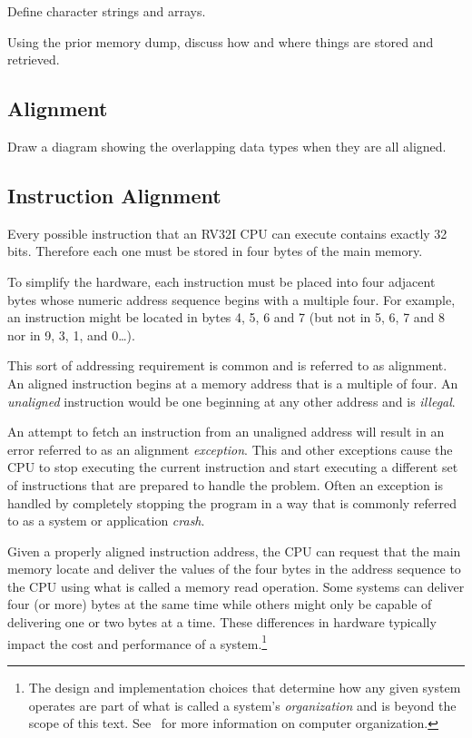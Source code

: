 Define character strings and arrays.

Using the prior memory dump, discuss how and where things are stored and
retrieved.

\subsection{Alignment}

Draw a diagram showing the overlapping data types when they are all aligned.


\subsection{Instruction Alignment}

%
Every possible instruction that an RV32I CPU can execute contains
exactly 32 bits.  Therefore each one must be stored in four bytes 
of the main memory.

To simplify the hardware, each instruction must be placed into four 
adjacent bytes whose numeric address sequence begins with a multiple 
four.  For example, an instruction might be located in bytes 
4, 5, 6 and 7 (but not in 5, 6, 7 and 8 nor in 9, 3, 1, and 0\ldots).

This sort of addressing requirement is common and is referred to as
\gls{alignment}.  An aligned instruction begins at a memory address
that is a multiple of four.  An {\em unaligned} instruction would
be one beginning at any other address and is {\em illegal}.

An attempt to fetch an instruction from an unaligned address
will result in an error referred to as an alignment {\em \gls{exception}}.
This and other exceptions cause the CPU to stop executing the
current instruction and start executing a different set of instructions
that are prepared to handle the problem.  Often an exception is
handled by completely stopping the program in a way that is commonly
referred to as a system or application {\em crash}.

Given a properly aligned instruction address, the CPU can request
that the main memory locate and deliver the values of the four bytes
in the address sequence to the CPU using what is called a memory
read operation.  Some systems can deliver four (or more) bytes at the
same time while others might only be capable of delivering one or
two bytes at a time.  These differences in hardware typically impact the
cost and performance of a system.\footnote{The design and implementation
choices that determine how any given system operates are part of what is
called a system's {\em organization} and is beyond the scope of this text.
See~\cite{codriscv:2017} for more information on computer organization.}

